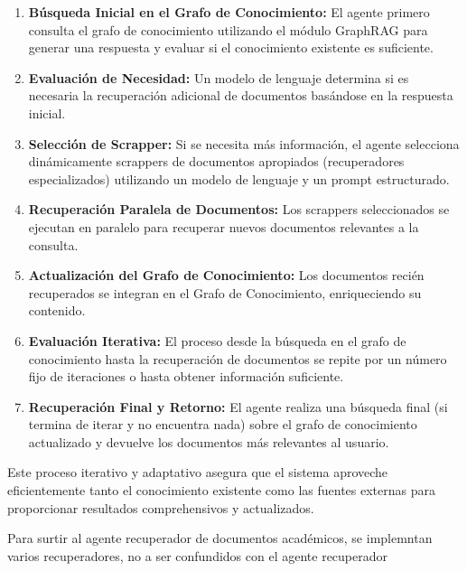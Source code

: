 \documentclass[12pt]{article}
\begin{document}
\begin{enumerate}
    \item \textbf{Búsqueda Inicial en el Grafo de Conocimiento:} El agente primero consulta el grafo de conocimiento utilizando el módulo GraphRAG para generar una respuesta y evaluar si el conocimiento existente es suficiente.
    \item \textbf{Evaluación de Necesidad:} Un modelo de lenguaje determina si es necesaria la recuperación adicional de documentos basándose en la respuesta inicial.
    \item \textbf{Selección de Scrapper:} Si se necesita más información, el agente selecciona dinámicamente scrappers de documentos apropiados (recuperadores especializados) utilizando un modelo de lenguaje y un prompt estructurado.
    \item \textbf{Recuperación Paralela de Documentos:} Los scrappers seleccionados se ejecutan en paralelo para recuperar nuevos documentos relevantes a la consulta.
    \item \textbf{Actualización del Grafo de Conocimiento:} Los documentos recién recuperados se integran en el Grafo de Conocimiento, enriqueciendo su contenido.
    \item \textbf{Evaluación Iterativa:} El proceso desde la búsqueda en el grafo de conocimiento hasta la recuperación de documentos se repite por un número fijo de iteraciones o hasta obtener información suficiente.
    \item \textbf{Recuperación Final y Retorno:} El agente realiza una búsqueda final (si termina de iterar y no encuentra nada) sobre el grafo de conocimiento actualizado y devuelve los documentos más relevantes al usuario.
\end{enumerate}

Este proceso iterativo y adaptativo asegura que el sistema aproveche eficientemente tanto el conocimiento existente como las fuentes externas para proporcionar resultados comprehensivos y actualizados.

Para surtir al agente recuperador de documentos académicos, se implemntan varios recuperadores, no a ser confundidos con el agente recuperador
\end{document}

